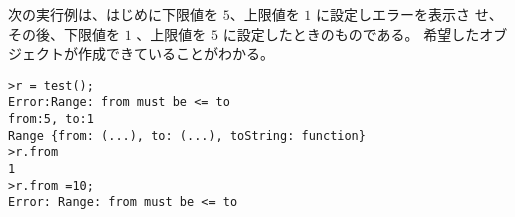 次の実行例は、はじめに下限値を $5$、上限値を $1$ に設定しエラーを表示さ
せ、その後、下限値を $1$ 、上限値を $5$ に設定したときのものである。
希望したオブジェクトが作成できていることがわかる。
\begin{verbatim}
>r = test();
Error:Range: from must be <= to
from:5, to:1
Range {from: (...), to: (...), toString: function}
>r.from
1
>r.from =10;
Error: Range: from must be <= to
\end{verbatim}